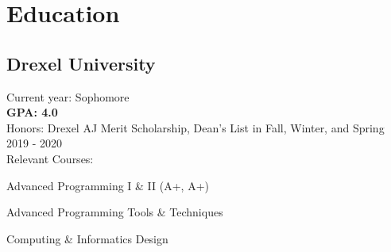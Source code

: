 \documentclass[]{deedy-resume-openfont}
\begin{document}
%
%
\lastupdated

%
%

%
%

\begin{minipage}[t]{0.33\textwidth}


    \section{Education}
    \subsection{Drexel University}
    Current year: Sophomore \\
    \textbf{GPA: 4.0} \\
    Honors: Drexel AJ Merit Scholarship, Dean's List in Fall, Winter, and Spring 2019 - 2020 \\
    Relevant Courses: \\
    \vspace{\topsep} %
    \begin{tightemize}
        \item Advanced Programming I \& II (A+, A+)
        \item Advanced Programming Tools \& Techniques
        \item Computing \& Informatics Design
    \end{tightemize}
    \sectionsep


\end{minipage}
\end{document}

